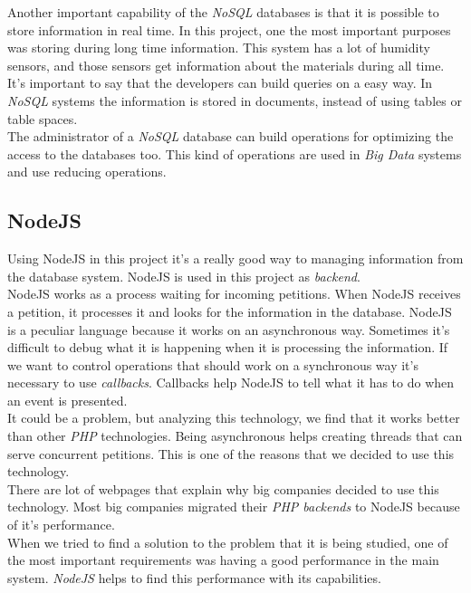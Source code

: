 Another important capability of the \textit{NoSQL} databases is that it is possible to store information in real time. In this project, one the most important purposes was storing during long time information. This system has a lot of humidity sensors, and those sensors get information about the materials during all time.\\

It's important to say that the developers can build queries on a easy way. In \textit{NoSQL} systems the information is stored in documents, instead of using tables or table spaces.\\

The administrator of a \textit{NoSQL} database can build operations for optimizing the access to the databases too. This kind of operations are used in \textit{Big Data} systems and use reducing operations.

\subsection{NodeJS}

Using NodeJS in this project it's a really good way to managing information from the database system. NodeJS is used in this project as \textit{backend}.\\

NodeJS works as a process waiting for incoming petitions. When NodeJS receives a petition, it processes it and looks for the information in the database. NodeJS is a peculiar language because it works on an asynchronous way. Sometimes it's difficult to debug what it is happening when it is processing the information. If we want to control operations that should work on a synchronous way it's necessary to use \textit{callbacks}. Callbacks help NodeJS to tell what it has to do when an event is presented.\\

It could be a problem, but analyzing this technology, we find that it works better than other \textit{PHP} technologies. Being asynchronous helps creating threads that can serve concurrent petitions. This is one of the reasons that we decided to use this technology.\\

There are lot of webpages that explain why big companies decided to use this technology. Most big companies migrated their \textit{PHP backends} to NodeJS because of it's performance.\\

When we tried to find a solution to the problem that it is being studied, one of the most important requirements was having a good performance in the main system. \textit{NodeJS} helps to find this performance with its capabilities.


